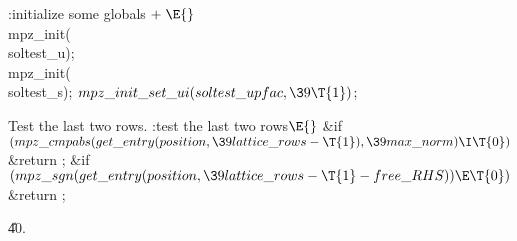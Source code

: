 \B{}:initialize some globals\X${}\mathrel+\E{}$\6
\\{mpz\_init}(\\{soltest\_u});\6
\\{mpz\_init}(\\{soltest\_s});\6
${}\\{mpz\_init\_set\_ui}(\\{soltest\_upfac},\39\T{1}){}$;\par
\fi

Test the last two rows.
\Y\B\4:test the last two rows\X${}\E{}$\6
\&{if} ${}(\\{mpz\_cmpabs}(\\{get\_entry}(\\{position},\39\\{lattice\_rows}-%
\T{1}),\39\\{max\_norm})\I\T{0}){}$\1\5
\&{return} ;\2\6
\&{if} ${}(\\{mpz\_sgn}(\\{get\_entry}(\\{position},\39\\{lattice\_rows}-\T{1}-%
\\{free\_RHS}))\E\T{0}){}$\1\5
\&{return} ;\2\par
\U40.\fi

